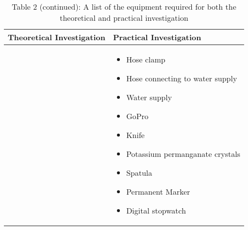\begin{table}[H]
	\centering
	\renewcommand{\arraystretch}{1.3}
	\begin{tabularx}{\textwidth}{|X|X|}
		\hline
		\textbf{Theoretical Investigation} & \textbf{Practical Investigation} \\
		\hline
		&
		\begin{itemize}[leftmargin=1.5em, itemsep=2pt, topsep=0pt, label=--]
			\item Hose clamp
			\item Hose connecting to water supply
			\item Water supply
			\item GoPro
			\item Knife
			\item Potassium permanganate crystals
			\item Spatula
			\item Permanent Marker
			\item Digital stopwatch
		\end{itemize} \\
		\hline
	\end{tabularx}
	\caption*{Table 2 (continued): A list of the equipment required for both the theoretical and practical investigation}
	\label{tab:equipmentList2}
\end{table}
